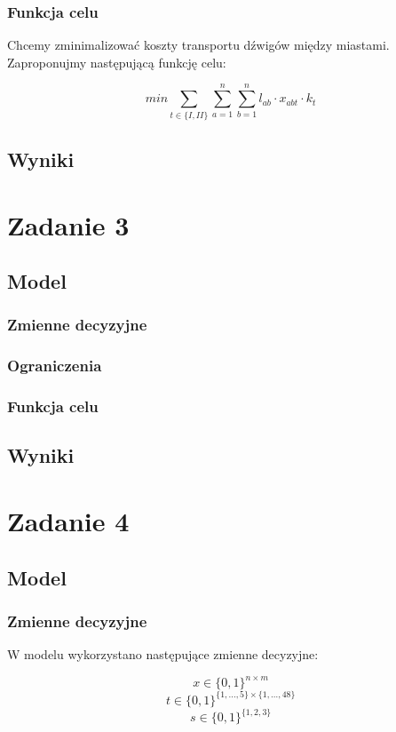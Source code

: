 \documentclass{article}
\theoremstyle{definition}
\theoremstyle{remark}
\theoremstyle{plain}
\theoremstyle{remark}
\theoremstyle{plain}
\begin{document}
\subsubsection{Funkcja celu}
Chcemy zminimalizować koszty transportu dźwigów między miastami. Zaproponujmy następującą funkcję celu:

\[ min {\sum_{t \in \{I,II\}}{\sum_{a=1}^{n}{\sum_{b=1}^{n}{l_{ab} \cdot x_{abt} \cdot k_t}}}} \]

\subsection{Wyniki}
    

\section{Zadanie 3}
\subsection{Model}
\subsubsection{Zmienne decyzyjne}
\subsubsection{Ograniczenia}
\subsubsection{Funkcja celu}

\subsection{Wyniki}

    
\section{Zadanie 4}
\subsection{Model}
\subsubsection{Zmienne decyzyjne}
W modelu wykorzystano następujące zmienne decyzyjne:

\[ x \in \{0,1\}^{n\times m} \]
\[ t \in \{0,1\}^{\{1,\ldots,5\}\times \{1,\ldots,48\}} \]
\[ s \in \{0,1\}^{\{1,2,3\}} \]
\end{document}
